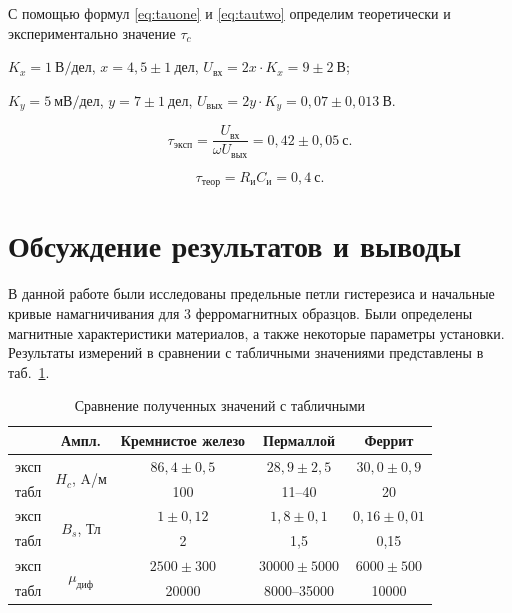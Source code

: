 \documentclass[a4paper, 12pt]{article}
\begin{document}
С помощью формул \eqref{eq:tauone} и \eqref{eq:tautwo} определим теоретически и экспериментально значение $\tau_c$

\begin{description}
\item{} $K_x = 1~В/дел$, $x = 4,5\pm1~дел$, $U_{вх} = 2x \cdot K_x = 9\pm2~В$;
\item{} $K_y = 5~мВ/дел$, $y = 7\pm1~дел$, $U_{вых} = 2y \cdot K_y = 0,07\pm0,013~В$.
\end{description}

$$\tau_{эксп} = \frac{U_{вх}}{\omega U_{вых}} = 0,42\pm0,05~с.$$

$$\tau_{теор} = R_и C_и = 0,4~с.$$

\newpage

\section{Обсуждение результатов и выводы}

В данной работе были исследованы предельные петли гистерезиса и начальные кривые намагничивания для 3 ферромагнитных образцов. Были определены магнитные характеристики материалов, а также некоторые параметры установки. Результаты измерений в сравнении с табличными значениями представлены в таб.~\ref{tab2}.

\begin{table}[h!]
\begin{center}
\begin{tabular}{|c|c|c|c|c|}
\hline
 & Ампл. & Кремнистое железо & Пермаллой & Феррит \\ \hline
эксп & \multirow{2}{*}{$H_c$, A/м} & $86,4 \pm 0,5$ & $28,9 \pm 2,5$ & $30,0 \pm 0,9$ \\ \cline{1-1} \cline{3-5} 
табл &  & 100 & 11--40 & 20 \\ \hline
эксп & \multirow{2}{*}{$B_s$, Тл} & $1 \pm 0,12$ & $1,8 \pm 0,1$ & $0,16 \pm 0,01$ \\ \cline{1-1} \cline{3-5} 
табл &  & 2 & 1,5 & 0,15 \\ \hline
эксп & \multirow{2}{*}{$\mu_{диф}$} & $2500 \pm 300$ & $30000 \pm 5000$ & $6000 \pm 500$ \\ \cline{1-1} \cline{3-5} 
табл &  & 20000 & 8000--35000 & 10000 \\ \hline
\end{tabular}
\end{center}
\caption{Сравнение полученных значений с табличными}
\label{tab2}
\end{table}
\end{document}
